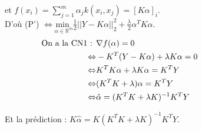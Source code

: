 \documentclass[12pt,a4paper]{article}
\begin{document}
et $f(x_i) = \sum_{j=1}^m \alpha_j k(x_i, x_j) = \left[K\alpha\right]_i$. \\

D'où (P') $\Leftrightarrow \underset{\alpha \in \mathbb{R}^m}{\text{min }} \frac{1}{2} ||Y - K\alpha||^2_2 + \frac{\lambda}{2} \alpha^T K \alpha$. \\

\begin{align*}
    \text{On a la CN1 : } &\nabla f(\alpha) = 0 \hspace{14.5cm} \\
    \Leftrightarrow &-K^T(Y - K\alpha) + \lambda K\alpha = 0 \\
    \Leftrightarrow &K^TK\alpha + \lambda K\alpha = K^TY \\
    \Leftrightarrow &(K^TK + \lambda)\alpha = K^TY \\
    \Leftrightarrow &\hat{\alpha} = (K^TK + \lambda K)^{-1}K^TY
\end{align*}

Et la prédiction : $K\hat{\alpha} = K(K^TK + \lambda K)^{-1}K^TY$. \\
\end{document}
